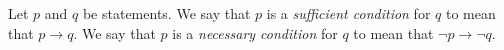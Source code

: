 \guard



\begin{defn}
\label{defn:sufficentAndNecessary}
  Let $p$ and $q$ be statements.
  We say that $p$ is a \emph{sufficient condition} for $q$ to mean that $p\rightarrow q$.
  We say that $p$ is a \emph{necessary condition} for $q$ to mean that $\neg p\rightarrow \neg q$.
\end{defn}

